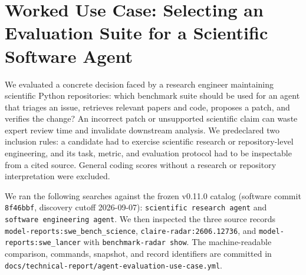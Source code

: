 \documentclass[11pt]{article}
\begin{document}
\section{Worked Use Case: Selecting an Evaluation Suite for a Scientific Software Agent}
\label{sec:industry-agent-use-case}

We evaluated a concrete decision faced by a research engineer maintaining scientific Python repositories: which benchmark suite should be used for an agent that triages an issue, retrieves relevant papers and code, proposes a patch, and verifies the change? An incorrect patch or unsupported scientific claim can waste expert review time and invalidate downstream analysis. We predeclared two inclusion rules: a candidate had to exercise scientific research or repository-level engineering, and its task, metric, and evaluation protocol had to be inspectable from a cited source. General coding scores without a research or repository interpretation were excluded.

We ran the following searches against the frozen v0.11.0 catalog (software commit \texttt{8f46bbf}, discovery cutoff 2026-09-07): \texttt{scientific research agent} and \texttt{software engineering agent}. We then inspected the three source records \texttt{model-reports:swe\_bench\_science}, \texttt{claire-radar:2606.12736}, and \texttt{model-reports:swe\_lancer} with \texttt{benchmark-radar show}. The machine-readable comparison, commands, snapshot, and record identifiers are committed in \texttt{docs/technical-report/agent-evaluation-use-case.yml}.
\end{document}

